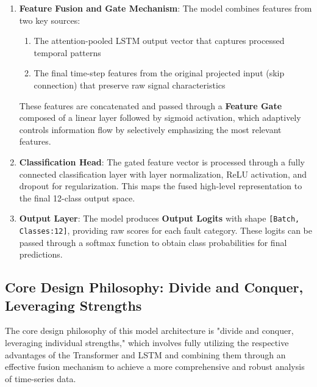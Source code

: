 \begin{enumerate}
    \item \textbf{Feature Fusion and Gate Mechanism}: The model combines features from two key sources:
    \begin{enumerate}
    \item The attention-pooled LSTM output vector that captures processed temporal patterns
    \item The final time-step features from the original projected input (skip connection) that preserve raw signal characteristics
    \end{enumerate}
    These features are concatenated and passed through a \textbf{Feature Gate} composed of a linear layer followed by sigmoid activation, which adaptively controls information flow by selectively emphasizing the most relevant features.

    \item \textbf{Classification Head}: The gated feature vector is processed through a fully connected classification layer with layer normalization, ReLU activation, and dropout for regularization. This maps the fused high-level representation to the final 12-class output space.

    \item \textbf{Output Layer}: The model produces \textbf{Output Logits} with shape \texttt{[Batch, Classes:12]}, providing raw scores for each fault category. These logits can be passed through a softmax function to obtain class probabilities for final predictions.
\end{enumerate}




\subsection{Core Design Philosophy: Divide and Conquer, Leveraging Strengths}

The core design philosophy of this model architecture is "divide and conquer, leveraging individual strengths," which involves fully utilizing the respective advantages of the Transformer and LSTM and combining them through an effective fusion mechanism to achieve a more comprehensive and robust analysis of time-series data.

